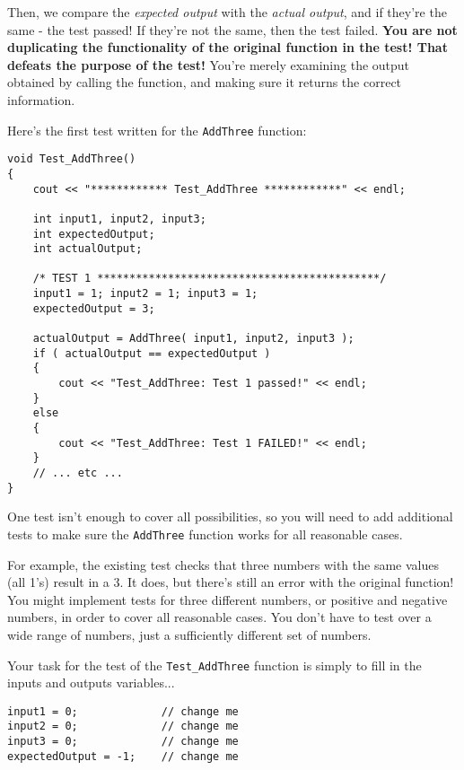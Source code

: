 \documentclass[a4paper,12pt]{book}
\begin{document}
    Then, we compare the \textit{expected output} with the \textit{actual output},
    and if they're the same - the test passed! If they're not the same,
    then the test failed.
    \textbf{You are not duplicating the functionality of the original
    function in the test! That defeats the purpose of the test!} You're
    merely examining the output obtained by calling the function, and
    making sure it returns the correct information.

    \newpage
    Here's the first test written for the \texttt{AddThree} function:
    
\begin{lstlisting}[style=code]
void Test_AddThree()
{
    cout << "************ Test_AddThree ************" << endl;

    int input1, input2, input3;
    int expectedOutput;
    int actualOutput;

    /* TEST 1 ********************************************/
    input1 = 1; input2 = 1; input3 = 1;
    expectedOutput = 3;

    actualOutput = AddThree( input1, input2, input3 );
    if ( actualOutput == expectedOutput )
    {
        cout << "Test_AddThree: Test 1 passed!" << endl;
    }
    else
    {
        cout << "Test_AddThree: Test 1 FAILED!" << endl;
    }
    // ... etc ...
}
\end{lstlisting}

    One test isn't enough to cover all possibilities, so you will
    need to add additional tests to make sure the \texttt{AddThree}
    function works for all reasonable cases.

    For example, the existing test checks that three numbers with the same
    values (all 1's) result in a 3. It does, but there's still an error
    with the original function!
    You might implement tests for three different numbers, or positive and
    negative numbers, in order to cover all reasonable cases. You don't
    have to test over a wide range of numbers, just a sufficiently
    different set of numbers.

    Your task for the test of the \texttt{Test\_AddThree} function is
    simply to fill in the inputs and outputs variables...
    
\begin{lstlisting}[style=code]
input1 = 0;             // change me
input2 = 0;             // change me
input3 = 0;             // change me
expectedOutput = -1;    // change me
\end{lstlisting}
\end{document}
